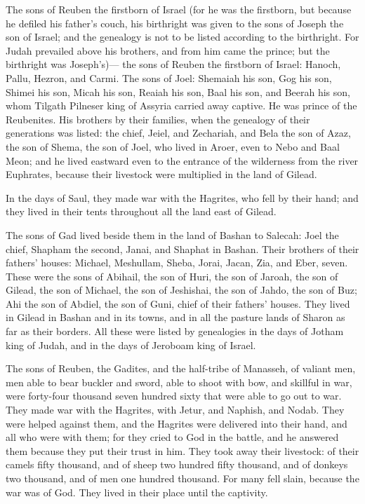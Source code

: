  The sons of Reuben the firstborn of Israel (for he was the
firstborn, but because he defiled his father's couch, his birthright was
given to the sons of Joseph the son of Israel; and the genealogy is not
to be listed according to the birthright.  For Judah
prevailed above his brothers, and from him came the prince; but the
birthright was Joseph's)---  the sons of Reuben the
firstborn of Israel: Hanoch, Pallu, Hezron, and Carmi.  The
sons of Joel: Shemaiah his son, Gog his son, Shimei his son,
 Micah his son, Reaiah his son, Baal his son, 
and Beerah his son, whom Tilgath Pilneser king of Assyria carried away
captive. He was prince of the Reubenites.  His brothers by
their families, when the genealogy of their generations was listed: the
chief, Jeiel, and Zechariah,  and Bela the son of Azaz, the
son of Shema, the son of Joel, who lived in Aroer, even to Nebo and Baal
Meon;  and he lived eastward even to the entrance of the
wilderness from the river Euphrates, because their livestock were
multiplied in the land of Gilead.

 In the days of Saul, they made war with the Hagrites, who
fell by their hand; and they lived in their tents throughout all the
land east of Gilead.

 The sons of Gad lived beside them in the land of Bashan to
Salecah:  Joel the chief, Shapham the second, Janai, and
Shaphat in Bashan.  Their brothers of their fathers'
houses: Michael, Meshullam, Sheba, Jorai, Jacan, Zia, and Eber, seven.
 These were the sons of Abihail, the son of Huri, the son
of Jaroah, the son of Gilead, the son of Michael, the son of Jeshishai,
the son of Jahdo, the son of Buz;  Ahi the son of Abdiel,
the son of Guni, chief of their fathers' houses.  They
lived in Gilead in Bashan and in its towns, and in all the pasture lands
of Sharon as far as their borders.  All these were listed
by genealogies in the days of Jotham king of Judah, and in the days of
Jeroboam king of Israel.

 The sons of Reuben, the Gadites, and the half-tribe of
Manasseh, of valiant men, men able to bear buckler and sword, able to
shoot with bow, and skillful in war, were forty-four thousand seven
hundred sixty that were able to go out to war.  They made
war with the Hagrites, with Jetur, and Naphish, and Nodab. 
They were helped against them, and the Hagrites were delivered into
their hand, and all who were with them; for they cried to God in the
battle, and he answered them because they put their trust in him.
 They took away their livestock: of their camels fifty
thousand, and of sheep two hundred fifty thousand, and of donkeys two
thousand, and of men one hundred thousand.  For many fell
slain, because the war was of God. They lived in their place until the
captivity.

